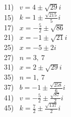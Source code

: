 \documentclass[11pt]{book}
\theoremstyle{definition}  %
\begin{document}
\begin{multicols}{2}
   11)~ $v=4\pm\sqrt{29}i$\\
   15)~ $k=1\pm\frac{\sqrt{215}}{5}i$\\
   17)~ $x=-\frac{5}{2}\pm\sqrt{86}$\\
   21)~ $x=-1\pm\sqrt{21}i$\\
   25)~ $x=-5\pm 2i$\\
   27)~ $n=3,~7$\\
   31)~ $x=2\pm\sqrt{29}i$\\
   35)~ $n=1,~7$\\
   37)~ $b=-1\pm\frac{\sqrt{258}}{6}i$\\
   41)~ $v=-\frac{5}{2}\pm\frac{\sqrt{87}}{2}i$\\
   45)~ $k=\frac{7}{2}\pm\frac{\sqrt{137}}{2}i$\\

\end{multicols}
\end{document}

